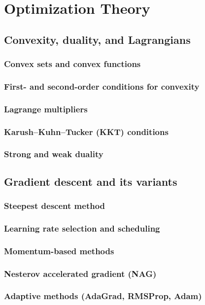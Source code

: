 ﻿\chapter{Optimization Theory}
\section{Convexity, duality, and Lagrangians}
\subsection{Convex sets and convex functions}
\subsection{First- and second-order conditions for convexity}
\subsection{Lagrange multipliers}
\subsection{Karush–Kuhn–Tucker (KKT) conditions}
\subsection{Strong and weak duality}

\section{Gradient descent and its variants}
\subsection{Steepest descent method}
\subsection{Learning rate selection and scheduling}
\subsection{Momentum-based methods}
\subsection{Nesterov accelerated gradient (NAG)}
\subsection{Adaptive methods (AdaGrad, RMSProp, Adam)}

